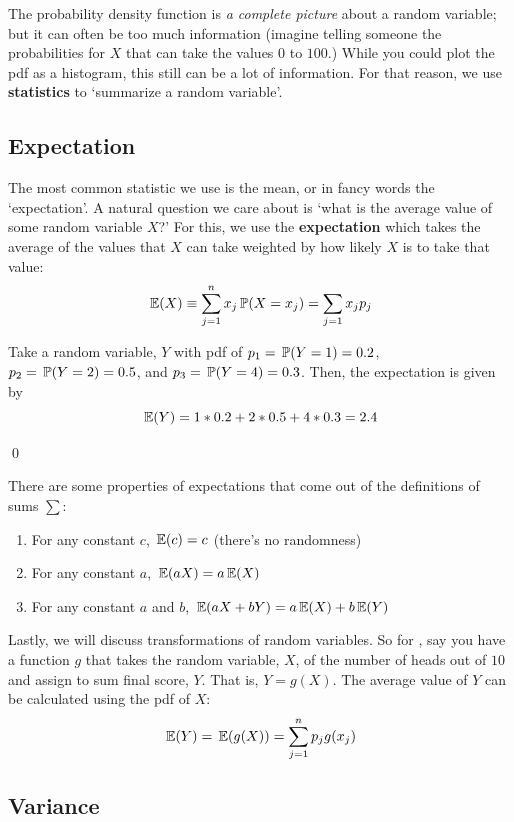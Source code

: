 \documentclass[12pt]{article}
\begin{document}
The probability density function is \emph{a complete picture} about a random variable; but it can often be too much information (imagine telling someone the probabilities for $X$ that can take the values $0$ to $100$.) While you could plot the pdf as a histogram, this still can be a lot of information. For that reason, we use \textbf{statistics} to `summarize a random variable'. 

\subsection*{Expectation}

The most common statistic we use is the mean, or in fancy words the `expectation'. A natural question we care about is `what is the average value of some random variable $X$?' For this, we use the \textbf{expectation} which takes the average of the values that $X$ can take weighted by how likely $X$ is to take that value:
$$
  \expec{X} \equiv \sum_{j=1}^n x_j \P(X = x_j) = \sum_{j=1} x_j p_j
$$

\begin{example}
  Take a random variable, $Y$ with pdf of $p_1 = \P{Y = 1} = 0.2$, $p_2 = \P{Y = 2} = 0.5$, and $p_3 = \P{Y = 4} = 0.3$. Then, the expectation is given by
  $$
    \expec{Y} = 1 * 0.2 + 2 * 0.5 + 4 * 0.3 = 2.4
  $$
  
  \qed
\end{example}

There are some properties of expectations that come out of the definitions of sums $\sum$:
\begin{enumerate}
  \item For any constant $c$, $\expec{c} = c$ (there's no randomness)
  \item For any constant $a$, $\expec{aX} = a \expec{X}$
  \item For any constant $a$ and $b$, $\expec{aX + bY} = a \expec{X} + b \expec{Y}$
\end{enumerate}

Lastly, we will discuss transformations of random variables. So for , say you have a function $g$ that takes the random variable, $X$, of the number of heads out of $10$ and assign to sum final score, $Y$. That is, $Y = g(X)$. The average value of $Y$ can be calculated using the pdf of $X$:
$$
  \expec{Y} = \expec{g(X)} = \sum_{j=1}^n p_j g(x_j)
$$

\subsection*{Variance}
\end{document}
